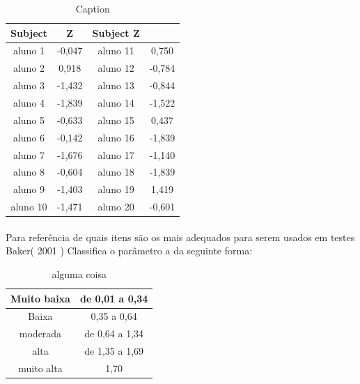     \begin{table}[!h]
        \centering
        \begin{tabular}{c|c|c|c}
            \hline
            Subject  &	Z	&	Subject	Z\\
            \hline
            \hline
            aluno 1  &	-0,047	&	aluno 11 &	0,750 \\
            \hline
            aluno 2  &	0,918	&	aluno 12 &	-0,784 \\
            \hline
            aluno 3  &	-1,432	&	aluno 13 &	-0,844 \\
            \hline
            aluno 4  &	-1,839	&	aluno 14 &	-1,522 \\
            \hline
            aluno 5  &	-0,633	&	aluno 15 &	0,437 \\
            \hline
            aluno 6  &	-0,142	&	aluno 16 &	-1,839 \\
            \hline
            aluno 7  &	-1,676	&	aluno 17 &	-1,140 \\
            \hline
            aluno 8  &	-0,604	&	aluno 18 &	-1,839 \\
            \hline
            aluno 9  &	-1,403	&	aluno 19 &	1,419 \\
            \hline
            aluno 10 &	-1,471	&	aluno 20 &	-0,601 \\
            \hline
        \end{tabular}
        \caption{Caption}
        \label{tab:my_label}
    \end{table}
	    
	\paragraph{}
	    Para referência de quais itens são os mais adequados para serem usados em testes Baker( 2001 ) Classifica o parâmetro a da seguinte forma: \\
	\begin{table}[!h]
	    \centering
	    \caption{alguma coisa}
    	\begin{tabular}{|c|c|}
    	    \hline
    	    Muito baixa & de 0,01 a 0,34\\
    	    \hline
    	    Baixa & 0,35 a 0,64\\
    	    \hline
    	    moderada & de 0,64 a 1,34\\
    	    \hline
    	    alta & de 1,35 a 1,69\\
    	    \hline
    	    muito alta & 1,70 \\
    	    \hline
    	\end{tabular}
	\end{table}
	

    \newpage
